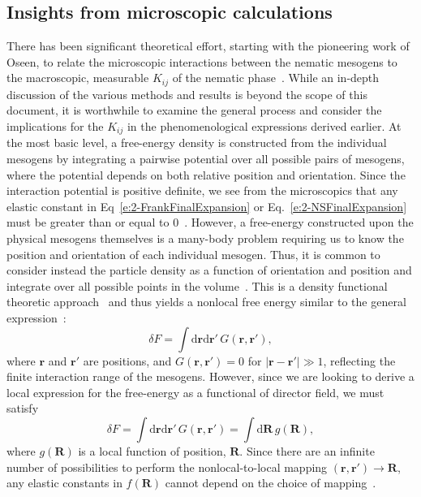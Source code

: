 \subsection{Insights from microscopic calculations}
There has been significant theoretical effort, starting with the pioneering work of Oseen, to relate the microscopic interactions between the nematic mesogens to the macroscopic, measurable $K_{ij}$ of the nematic phase~\cite{RN56,RN55,RN205,RN217,RN225,RN224,RN218,RN222}.
While an in-depth discussion of the various methods and results is beyond the scope of this document, it is worthwhile to examine the general process and consider the implications for the $K_{ij}$ in the phenomenological expressions derived earlier.
At the most basic level, a free-energy density is constructed from the individual mesogens by integrating a pairwise potential over all possible pairs of mesogens, where the potential depends on both relative position and orientation.
Since the interaction potential is positive definite, we see from the microscopics that any elastic constant in Eq~\ref{e:2-FrankFinalExpansion} or Eq.~\ref{e:2-NSFinalExpansion} must be greater than or equal to 0~\cite{RN205}.
However, a free-energy constructed upon the physical mesogens themselves is a many-body problem requiring us to know the position and orientation of each individual mesogen.
Thus, it is common to consider instead the particle density as a function of orientation and position and integrate over all possible points in the volume~\cite{RN222}.
This is a density functional theoretic approach~\cite{RN223} and thus yields a nonlocal free energy similar to the general expression~\cite{RN56,RN55}:
\begin{equation}
  \delta F = \int \textrm{d}\mathbf{r} \textrm{d}\mathbf{r}' \, G(\mathbf{r},\mathbf{r}'),
\end{equation}
where $\mathbf{r}$ and $\mathbf{r}'$ are positions, and $G(\mathbf{r},\mathbf{r}') = 0$ for $|\mathbf{r}-\mathbf{r}'| \gg 1$, reflecting the finite interaction range of the mesogens.
However, since we are looking to derive a local expression for the free-energy as a functional of director field, we must satisfy
\begin{equation}
  \delta F = \int \textrm{d}\mathbf{r} \textrm{d}\mathbf{r}' \, G(\mathbf{r},\mathbf{r}')
  = \int \textrm{d} \mathbf{R} \, g(\mathbf{R}),\label{e:2-NonlocalLocal}
\end{equation}
where $g(\mathbf{R})$ is a local function of position, $\mathbf{R}$.
Since there are an infinite number of possibilities to perform the nonlocal-to-local mapping $(\mathbf{r},\mathbf{r}') \rightarrow \mathbf{R}$, any elastic constants in $f(\mathbf{R})$ cannot depend on the choice of mapping~\cite{RN55}.
